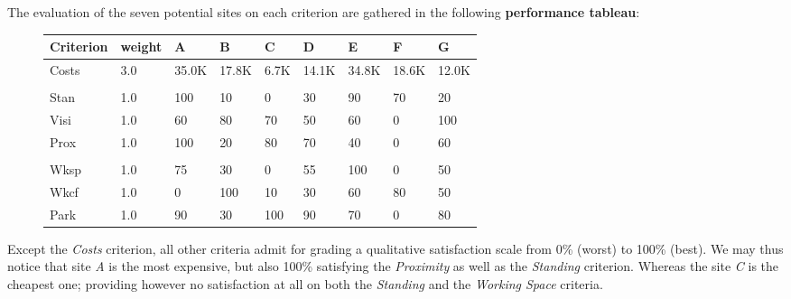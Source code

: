 \documentclass[letterpaper,10pt,english]{sphinxmanual}
\begin{document}
\begin{description}
\item[{The evaluation of the seven potential sites on each criterion are gathered in the following \textbf{performance tableau}:}] \leavevmode
\begin{tabulary}{\linewidth}{|L|L|L|L|L|L|L|L|L|}
\hline
\textsf{\relax 
Criterion
} & \textsf{\relax 
weight
} & \textsf{\relax 
A
} & \textsf{\relax 
B
} & \textsf{\relax 
C
} & \textsf{\relax 
D
} & \textsf{\relax 
E
} & \textsf{\relax 
F
} & \textsf{\relax 
G
}\\
\hline
Costs
 & 
3.0
 & 
35.0K\texteuro{}
 & 
17.8K\texteuro{}
 & 
6.7K\texteuro{}
 & 
14.1K\texteuro{}
 & 
34.8K\texteuro{}
 & 
18.6K\texteuro{}
 & 
12.0K\texteuro{}
\\
\hline

 & 

 & 

 & 

 & 

 & 

 & 

 & 

 & 

\\
\hline
Stan
 & 
1.0
 & 
100
 & 
10
 & 
0
 & 
30
 & 
90
 & 
70
 & 
20
\\
\hline
Visi
 & 
1.0
 & 
60
 & 
80
 & 
70
 & 
50
 & 
60
 & 
0
 & 
100
\\
\hline
Prox
 & 
1.0
 & 
100
 & 
20
 & 
80
 & 
70
 & 
40
 & 
0
 & 
60
\\
\hline

 & 

 & 

 & 

 & 

 & 

 & 

 & 

 & 

\\
\hline
Wksp
 & 
1.0
 & 
75
 & 
30
 & 
0
 & 
55
 & 
100
 & 
0
 & 
50
\\
\hline
Wkcf
 & 
1.0
 & 
0
 & 
100
 & 
10
 & 
30
 & 
60
 & 
80
 & 
50
\\
\hline
Park
 & 
1.0
 & 
90
 & 
30
 & 
100
 & 
90
 & 
70
 & 
0
 & 
80
\\
\hline\end{tabulary}


\end{description}

Except the \emph{Costs} criterion, all other criteria admit for grading a qualitative satisfaction scale from 0\% (worst) to 100\% (best). We may thus notice that site \emph{A} is the most expensive, but also 100\% satisfying the \emph{Proximity} as well as the  \emph{Standing} criterion. Whereas the site \emph{C} is the cheapest one; providing however no satisfaction at all on both the \emph{Standing} and the \emph{Working Space} criteria.
\end{document}
